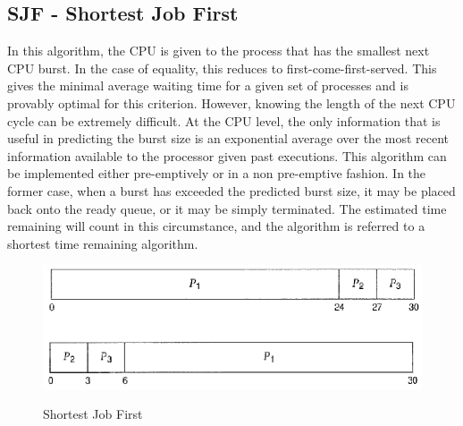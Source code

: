 \documentclass[10pt,a4paper]{article}
\begin{document}
\begin{itemize}
\subsection{SJF - Shortest Job First}
In this algorithm, the CPU is given to the process that has the smallest next CPU burst. In the case of equality, this reduces to first-come-first-served. This gives the minimal average waiting time for a given set of processes and is provably optimal \cite{proveoptsjf} for this criterion. However, knowing the length of the next CPU cycle can be extremely difficult. At the CPU level, the only information that is useful in predicting the burst size is an exponential average over the most recent information available to the processor given past executions. This algorithm can be implemented either pre-emptively or in a non pre-emptive fashion. In the former case, when a burst has exceeded the predicted burst size, it may be placed back onto the ready queue, or it may be simply terminated. The estimated time remaining will count in this circumstance, and the algorithm is referred to a shortest time remaining algorithm.  
\begin{figure}
\caption{Shortest Job First \cite{OSCONCEPTS}}
\begin{center}
\includegraphics[scale=0.45]{../images/fcfs-sched.png}
\label{fcfs}
\end{center}
\end{figure}

\end{itemize}
\end{document}
